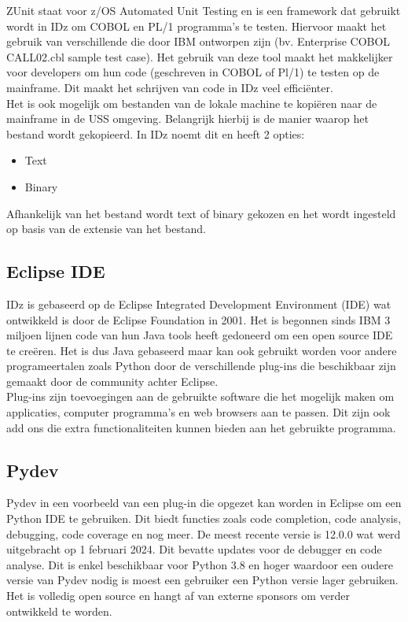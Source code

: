 ZUnit staat voor z/OS Automated Unit Testing en is een framework dat gebruikt wordt in IDz om COBOL en PL/1 programma's te testen. Hiervoor maakt het gebruik van verschillende  die door IBM ontworpen zijn (bv. Enterprise COBOL CALL02.cbl sample test case). Het gebruik van deze tool maakt het makkelijker voor developers om hun code (geschreven in COBOL of Pl/1) te testen op de mainframe. Dit maakt het schrijven van code in IDz veel efficiënter. \autocite{IBM2024a} \\

Het is ook mogelijk om bestanden van de lokale machine te kopiëren naar de mainframe in de USS omgeving. Belangrijk hierbij is de manier waarop het bestand wordt gekopieerd. In IDz noemt dit  en heeft 2 opties: 
\begin{itemize}
    \item Text
    \item Binary
\end{itemize}
Afhankelijk van het bestand wordt text of binary gekozen en het wordt ingesteld op basis van de extensie van het bestand.

\subsection{Eclipse IDE}
IDz is gebaseerd op de Eclipse Integrated Development Environment (IDE) wat ontwikkeld is door de Eclipse Foundation in 2001. Het is begonnen sinds IBM 3 miljoen lijnen code van hun Java tools heeft gedoneerd om een open source IDE te creëren. Het is dus Java gebaseerd maar kan ook gebruikt worden voor andere programeertalen zoals Python door de verschillende plug-ins die beschikbaar zijn gemaakt door de community achter Eclipse. \autocite{Hanna2021} \\

Plug-ins zijn toevoegingen aan de gebruikte software die het mogelijk maken om applicaties, computer programma's en web browsers aan te passen. Dit zijn ook add ons die extra functionaliteiten kunnen bieden aan het gebruikte programma. \autocite{George2021} 

\subsection{Pydev}
Pydev in een voorbeeld van een plug-in die opgezet kan worden in Eclipse om een Python IDE te gebruiken.  Dit biedt functies zoals code completion, code analysis, debugging, code coverage en nog meer. De meest recente versie is 12.0.0 wat werd uitgebracht op 1 februari 2024. Dit bevatte updates voor de debugger en code analyse. Dit is enkel beschikbaar voor Python 3.8 en hoger waardoor een oudere versie van Pydev nodig is moest een gebruiker een Python versie lager gebruiken. Het is volledig open source en hangt af van externe sponsors om verder ontwikkeld te worden. \autocite{Pydev2024}

